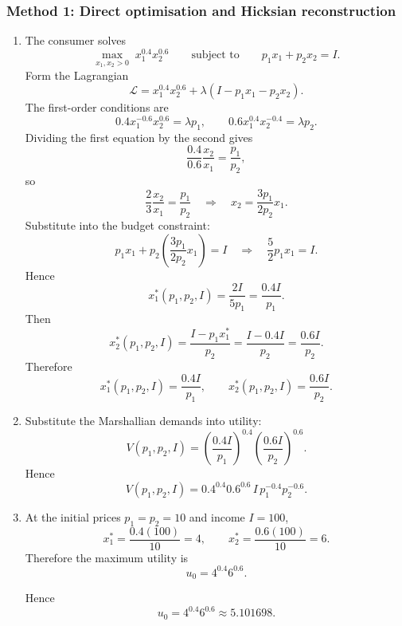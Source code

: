 \documentclass[12pt]{article}
\begin{document}
\subsubsection{Method 1: Direct optimisation and Hicksian reconstruction}
\begin{enumerate}[label=(\alph*)]
    \item
    The consumer solves
    \[
    \max_{x_1,x_2>0}\; x_1^{0.4}x_2^{0.6}
    \qquad\text{subject to}\qquad
    p_1x_1+p_2x_2=I.
    \]
    Form the Lagrangian
    \[
    \mathcal L=x_1^{0.4}x_2^{0.6}+\lambda(I-p_1x_1-p_2x_2).
    \]
    The first-order conditions are
    \[
    0.4x_1^{-0.6}x_2^{0.6}=\lambda p_1,
    \qquad
    0.6x_1^{0.4}x_2^{-0.4}=\lambda p_2.
    \]
    Dividing the first equation by the second gives
    \[
    \frac{0.4}{0.6}\frac{x_2}{x_1}=\frac{p_1}{p_2},
    \]
    so
    \[
    \frac{2}{3}\frac{x_2}{x_1}=\frac{p_1}{p_2}
    \quad\Longrightarrow\quad
    x_2=\frac{3p_1}{2p_2}x_1.
    \]
    Substitute into the budget constraint:
    \[
    p_1x_1+p_2\left(\frac{3p_1}{2p_2}x_1\right)=I
    \quad\Longrightarrow\quad
    \frac{5}{2}p_1x_1=I.
    \]
    Hence
    \[
    x_1^*(p_1,p_2,I)=\frac{2I}{5p_1}=\frac{0.4I}{p_1}.
    \]
    Then
    \[
    x_2^*(p_1,p_2,I)=\frac{I-p_1x_1^*}{p_2}
    =\frac{I-0.4I}{p_2}
    =\frac{0.6I}{p_2}.
    \]
    Therefore
    \[
    \boxed{
    x_1^*(p_1,p_2,I)=\frac{0.4I}{p_1},
    \qquad
    x_2^*(p_1,p_2,I)=\frac{0.6I}{p_2}.
    }
    \]

    \item
    Substitute the Marshallian demands into utility:
    \[
    V(p_1,p_2,I)
    =
    \left(\frac{0.4I}{p_1}\right)^{0.4}
    \left(\frac{0.6I}{p_2}\right)^{0.6}.
    \]
    Hence
    \[
    \boxed{
    V(p_1,p_2,I)
    =
    0.4^{0.4}0.6^{0.6}\,
    I\,
    p_1^{-0.4}p_2^{-0.6}.
    }
    \]

    \item
    At the initial prices \(p_1=p_2=10\) and income \(I=100\),
    \[
    x_1^*=\frac{0.4(100)}{10}=4,
    \qquad
    x_2^*=\frac{0.6(100)}{10}=6.
    \]
    Therefore the maximum utility is
    \[
    u_0=4^{0.4}6^{0.6}.
    \]

    Hence
    \[
    \boxed{u_0=4^{0.4}6^{0.6}\approx 5.101698.}
    \]


\end{enumerate}
\end{document}
